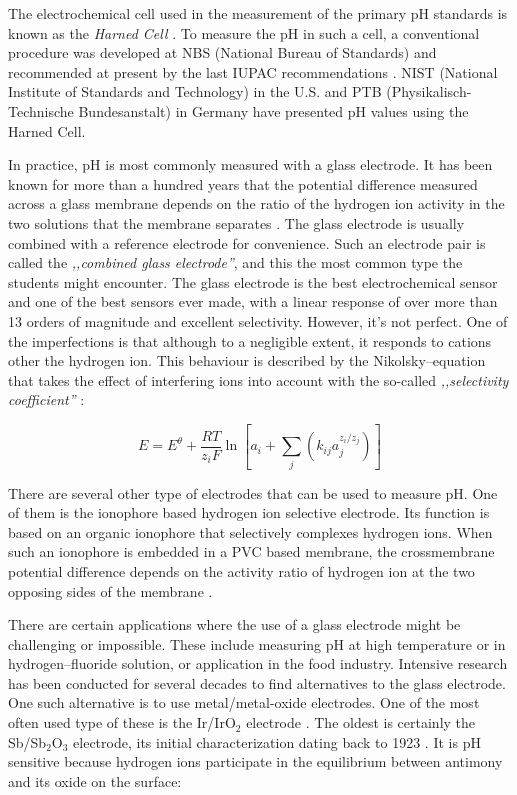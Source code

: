 \documentclass[manuscript=article, journal=jceda8]{achemso}
\begin{document}
The electrochemical cell used in the measurement of the primary pH standards is known as the \emph{Harned Cell} \cite{harned1958activity}.
To measure the pH in such a cell, a conventional procedure was developed at NBS (National Bureau of Standards) \cite{durst1975standardization} and recommended at present by the last IUPAC recommendations \cite{covington2002measurement}.
NIST (National Institute of Standards and Technology) in the U.S. and PTB (Physikalisch-Technische Bundesanstalt) in Germany have presented pH values using the Harned Cell. 

In practice, pH is most commonly measured with a glass electrode.
It has been known for more than a hundred years that the potential difference measured across  a glass membrane depends on the ratio of the hydrogen ion activity in the two solutions that the membrane separates \cite{haber1909elektrische, haber1909concerning}.
The glass electrode is usually combined with a reference electrode for convenience.
Such an electrode pair is called the \emph{,,combined glass electrode''}, and this the most common type the students might encounter.
The glass electrode is the best electrochemical sensor and one of the best sensors ever made, with a linear response of over more than 13 orders of magnitude and excellent selectivity.
However, it's not perfect. One of the imperfections is that although to a negligible extent, it responds to cations other the hydrogen ion.
This behaviour is described by the Nikolsky--equation that takes the effect of interfering ions into account with the so-called \emph{,,selectivity coefficient''} \cite{nicolsky1937theory}:

\begin{equation}
E=E^\theta + \frac{RT}{z_iF} \ln \left [ a_i + \sum_{j} \left ( k_{ij}a_j^{z_i/z_j} \right ) \right ]
\end{equation}

There are several other type of electrodes that can be used to measure pH.
One of them is the ionophore based hydrogen ion selective electrode. 
Its function is based on an organic ionophore that selectively complexes hydrogen ions.
When such an ionophore is embedded in a PVC based membrane, the crossmembrane potential difference depends on the activity ratio of hydrogen ion at the two opposing sides of the membrane \cite{goldcamp2010inexpensive}.

There are certain applications where the use of a glass electrode might be challenging or impossible.
These include measuring pH at high temperature or in hydrogen--fluoride solution, or application in the food industry. 
Intensive research has been conducted for several decades to find alternatives to the glass electrode. One such alternative is to use metal/metal-oxide electrodes.
One of the most often used type of these is the Ir/IrO$_2$ electrode \cite{beyenal2004improved}.
The oldest is certainly the Sb/Sb$_2$O$_3$ electrode, its initial characterization dating back to 1923 \cite{uhl1923electrometric}.
It is pH sensitive because hydrogen ions participate in the equilibrium between antimony and its oxide on the surface:
\end{document}
